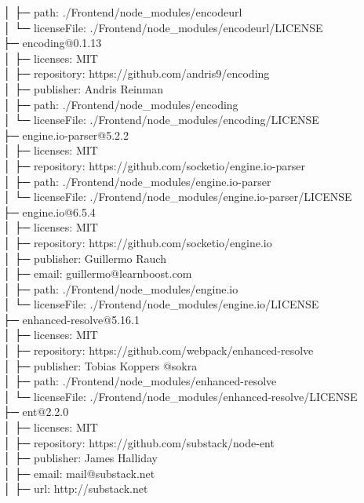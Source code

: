 │  ├─ path: ./Frontend/node\_modules/encodeurl\\
│  └─ licenseFile: ./Frontend/node\_modules/encodeurl/LICENSE\\
├─ encoding@0.1.13\\
│  ├─ licenses: MIT\\
│  ├─ repository: https://github.com/andris9/encoding\\
│  ├─ publisher: Andris Reinman\\
│  ├─ path: ./Frontend/node\_modules/encoding\\
│  └─ licenseFile: ./Frontend/node\_modules/encoding/LICENSE\\
├─ engine.io-parser@5.2.2\\
│  ├─ licenses: MIT\\
│  ├─ repository: https://github.com/socketio/engine.io-parser\\
│  ├─ path: ./Frontend/node\_modules/engine.io-parser\\
│  └─ licenseFile: ./Frontend/node\_modules/engine.io-parser/LICENSE\\
├─ engine.io@6.5.4\\
│  ├─ licenses: MIT\\
│  ├─ repository: https://github.com/socketio/engine.io\\
│  ├─ publisher: Guillermo Rauch\\
│  ├─ email: guillermo@learnboost.com\\
│  ├─ path: ./Frontend/node\_modules/engine.io\\
│  └─ licenseFile: ./Frontend/node\_modules/engine.io/LICENSE\\
├─ enhanced-resolve@5.16.1\\
│  ├─ licenses: MIT\\
│  ├─ repository: https://github.com/webpack/enhanced-resolve\\
│  ├─ publisher: Tobias Koppers @sokra\\
│  ├─ path: ./Frontend/node\_modules/enhanced-resolve\\
│  └─ licenseFile: ./Frontend/node\_modules/enhanced-resolve/LICENSE\\
├─ ent@2.2.0\\
│  ├─ licenses: MIT\\
│  ├─ repository: https://github.com/substack/node-ent\\
│  ├─ publisher: James Halliday\\
│  ├─ email: mail@substack.net\\
│  ├─ url: http://substack.net\\
